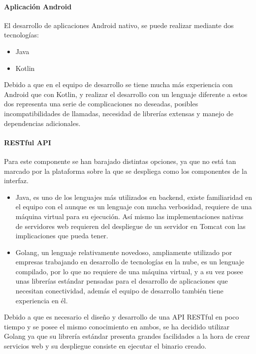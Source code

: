 \documentclass{article}
\begin{document}
\paragraph*{Aplicación Android}
El desarrollo de aplicaciones Android nativo, se puede realizar mediante dos tecnologías:

\begin{itemize}
    \item Java
    \item Kotlin
\end{itemize}

Debido a que en el equipo de desarrollo se tiene mucha más experiencia con Android que con Kotlin, y realizar 
el desarrollo con un lenguaje diferente a estos dos representa una serie de complicaciones no deseadas, 
posibles incompatibilidades de llamadas, necesidad de librerías extensas y manejo de dependencias adicionales.

\paragraph*{RESTful API} \label{REST_API}

Para este componente se han barajado distintas opciones, ya que no está tan marcado por la plataforma sobre la que se despliega como los componentes de la interfaz.
\begin{itemize}
    \item Java, es uno de los lenguajes más utilizados en backend, existe familiaridad en el equipo con el aunque es un lenguaje con mucha verbosidad, requiere
        de una máquina virtual para su ejecución. Así mismo las implementaciones nativas de servidores web requieren del despliegue de un servidor en Tomcat con
        las implicaciones que pueda tener.
    \item Golang, un lenguaje relativamente novedoso, ampliamente utilizado por empresas trabajando en desarrollo de tecnologías en la nube, es un lenguaje 
        compilado, por lo que no requiere de una máquina virtual, y a su vez posee unas librerías estándar pensadas para el desarrollo de aplicaciones que 
        necesitan conectividad, además el equipo de desarrollo también tiene experiencia en él.
\end{itemize}

Debido a que es necesario el diseño y desarrollo de una API RESTful en poco tiempo y se posee el mismo conocimiento en ambos, se ha decidido utilizar Golang ya que su librería estándar presenta grandes facilidades a la hora de crear servicios web y su despliegue consiste en ejecutar el binario creado.
\end{document}
